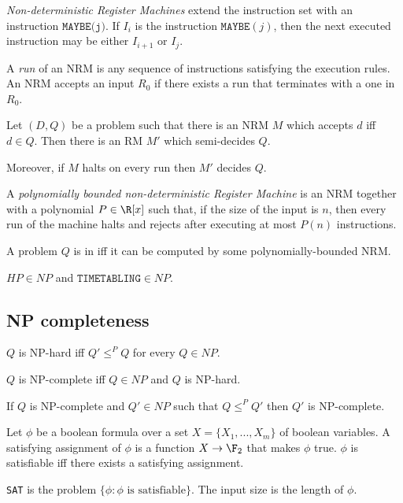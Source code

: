 \documentclass{article}
\begin{document}
\begin{definition*}[NRM]
	\emph{Non-deterministic Register Machines} extend the instruction set with an instruction
	$\texttt{MAYBE(j)}$. If $I_i$ is the instruction $\texttt{MAYBE}(j)$, then the next executed instruction
	may be either $I_{i+1}$ or $I_j$.

	A \emph{run} of an NRM is any sequence of instructions satisfying the execution rules. An NRM accepts
	an input $R_0$ if there exists a run that terminates with a one in $R_0$.
\end{definition*}

\begin{theorem*}[Notes II.10]
	Let $(D,Q)$ be a problem such that there is an NRM $M$ which accepts $d$ iff $d\in Q$.
	Then there is an RM $M'$ which semi-decides $Q$.

	Moreover, if $M$ halts on every run then $M'$ decides $Q$.
\end{theorem*}

\begin{definition*}[NP]
	A \emph{polynomially bounded non-deterministic Register Machine} is an NRM together with a polynomial
	$P\in\R[x]$ such that, if the size of the input is $n$, then every run of the machine halts and
	rejects after executing at most $P(n)$ instructions.

	A problem $Q$ is in \nptime iff it can be computed by some polynomially-bounded NRM.
\end{definition*}

\begin{theorem*}[Notes II.12]
	$HP\in NP$ and $\texttt{TIMETABLING}\in NP$.
\end{theorem*}

\subsection{NP completeness}

\begin{definition*}
	$Q$ is NP-hard iff $Q'\leq^P Q$ for every $Q\in NP$.

	$Q$ is NP-complete iff $Q\in NP$ and $Q$ is NP-hard.
\end{definition*}

\begin{theorem*}[II.15]
	If $Q$ is NP-complete and $Q'\in NP$ such that $Q\leq^P Q'$
	then $Q'$ is NP-complete.
\end{theorem*}

\begin{definition*}[SAT]
	Let $\phi$ be a boolean formula over a set $X=\{X_1, ..., X_m\}$ of
	boolean variables. A satisfying assignment of $\phi$ is a function
	$X\to\F_2$ that makes $\phi$ true. $\phi$ is satisfiable iff
	there exists a satisfying assignment.

	\texttt{SAT} is the problem $\{\phi : \phi \text{ is satisfiable}\}$.
	The input size is the length of $\phi$.
\end{definition*}
\end{document}
